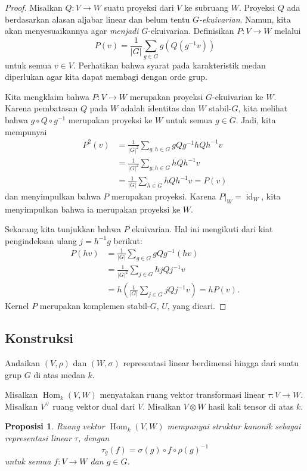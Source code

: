 \documentclass[12pt]{article}
\theoremstyle{plain}
\newtheorem{proposition}[theorem]{Proposisi}
\theoremstyle{definition}
\theoremstyle{remark}
\numberwithin{equation}{section}
\begin{document}
\begin{proof}
Misalkan $Q: V \to W$ suatu proyeksi dari $V$ ke subruang $W$.
Proyeksi $Q$ ada berdasarkan alasan aljabar linear
dan belum tentu \emph{$G$-ekuivarian}.
Namun, kita akan menyesuaikannya agar \emph{menjadi} $G$-ekuivarian.
Definisikan $P : V \to W$ melalui
\[
P(v) = \frac{1}{|G|} \sum_{g \in G} g\left( Q\left( g^{-1} v\right)\right)
\]
untuk semua $v \in V$. Perhatikan bahwa syarat pada karakteristik
medan diperlukan agar kita dapat membagi dengan orde grup.

Kita mengklaim bahwa $P : V \to W$ merupakan proyeksi $G$-ekuivarian ke $W$.
Karena pembatasan $Q$ pada $W$ adalah identitas dan $W$ stabil-$G$,
kita melihat bahwa
$g \circ Q \circ g^{-1}$ merupakan proyeksi ke $W$
untuk semua $g \in G$. Jadi, kita mempunyai
\begin{align*}
P^2(v) &=
\frac{1}{|G|^2} \sum_{g,h \in G} gQg^{-1} hQh^{-1}v\\
&=\frac{1}{|G|^2} \sum_{g,h \in G} hQh^{-1}v\\
&=\frac{1}{|G|} \sum_{h \in G} hQh^{-1}v = P(v)
\end{align*}
dan menyimpulkan bahwa $P$ merupakan proyeksi. Karena
$P|_W=\operatorname{id}_W$, kita menyimpulkan bahwa ia merupakan proyeksi ke $W$.

Sekarang kita tunjukkan bahwa $P$ ekuivarian.
Hal ini mengikuti dari kiat pengindeksan ulang $j=h^{-1}g$ berikut:
\begin{align*}
P(hv) &=
\frac{1}{|G|} \sum_{g \in G} gQg^{-1} (hv)\\
&=\frac{1}{|G|^2} \sum_{j \in G} hjQj^{-1}v\\
&=h\left(\frac{1}{|G|} \sum_{j \in G} jQj^{-1}v\right) = hP(v).
\end{align*}
Kernel $P$ merupakan komplemen stabil-$G$, $U$, yang dicari.
\end{proof}

\subsection{Konstruksi}

Andaikan $(V,\rho)$ dan $(W,\sigma)$ representasi linear berdimensi hingga
dari suatu grup $G$ di atas medan $k$.

Misalkan $\operatorname{Hom}_k(V,W)$ menyatakan ruang vektor transformasi linear
$\tau : V \to W$.
Misalkan $V^\vee$ ruang vektor dual dari $V$.
Misalkan $V \otimes W$ hasil kali tensor di atas $k$.

\begin{proposition}
Ruang vektor $\operatorname{Hom}_k(V,W)$ mempunyai struktur kanonik sebagai representasi
linear $\tau$, dengan
\[
 \tau_g(f) = \sigma(g) \circ f \circ \rho(g)^{-1}
\]
untuk semua $f : V \to W$ dan $g \in G$.
\end{proposition}
\end{document}
